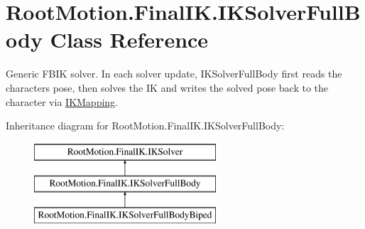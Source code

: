 \hypertarget{class_root_motion_1_1_final_i_k_1_1_i_k_solver_full_body}{}\section{Root\+Motion.\+Final\+I\+K.\+I\+K\+Solver\+Full\+Body Class Reference}
\label{class_root_motion_1_1_final_i_k_1_1_i_k_solver_full_body}


Generic F\+B\+IK solver. In each solver update, I\+K\+Solver\+Full\+Body first reads the character\textquotesingle{}s pose, then solves the IK and writes the solved pose back to the character via \mbox{\hyperlink{class_root_motion_1_1_final_i_k_1_1_i_k_mapping}{I\+K\+Mapping}}.  


Inheritance diagram for Root\+Motion.\+Final\+I\+K.\+I\+K\+Solver\+Full\+Body\+:\begin{figure}[H]
\begin{center}
\leavevmode
\includegraphics[height=3.000000cm]{class_root_motion_1_1_final_i_k_1_1_i_k_solver_full_body}
\end{center}
\end{figure}
